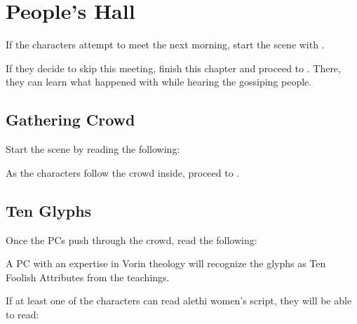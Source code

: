\section{People's Hall}
\label{sec:peoplesHall}

If the characters attempt to meet \npcTroublemaker{} the next morning, start the scene with .

If they decide to skip this meeting, finish this chapter and proceed to . There, they can learn what happened with \npcRebelArdent{} while hearing the gossiping people.

\subsection{Gathering Crowd}
\label{ssec:peoplesHallCrowd}

Start the scene by reading the following:


As the characters follow the crowd inside, proceed to .




\subsection{Ten Glyphs}
\label{ssec:peoplesHallGlyphs}

Once the PCs push through the crowd, read the following:


A PC with an expertise in Vorin theology will recognize the glyphs as Ten Foolish Attributes from the teachings.

If at least one of the characters can read alethi women's script, they will be able to read:

